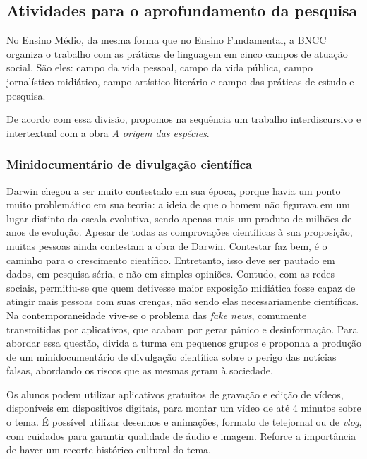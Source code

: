 \documentclass[11pt]{extarticle}
\begin{document}
\subsection{Atividades para o aprofundamento da pesquisa}

No Ensino Médio, da mesma forma que no Ensino Fundamental, a BNCC organiza
o trabalho com as práticas de linguagem em cinco campos de atuação
social. São eles: campo da vida pessoal, campo da vida pública, campo
jornalístico-midiático, campo artístico-literário e campo das práticas de
estudo e pesquisa.

De acordo com essa divisão, propomos na sequência um trabalho interdiscursivo
e intertextual com a obra \emph{A origem das espécies}.
	
\subsubsection{Minidocumentário de
      divulgação científica}

Darwin chegou a ser muito contestado em sua época, porque
      havia um ponto muito problemático em sua teoria: a ideia de que o homem
      não figurava em um lugar distinto da escala evolutiva, sendo apenas mais
      um produto de milhões de anos de evolução. Apesar de todas as
      comprovações científicas à sua proposição, muitas pessoas ainda contestam
      a obra de Darwin. Contestar faz bem, é o caminho para o crescimento
      científico. Entretanto, isso deve ser pautado em dados, em pesquisa
      séria, e não em simples opiniões. Contudo, com as redes sociais,
      permitiu-se que quem detivesse maior exposição midiática fosse capaz de
      atingir mais pessoas com suas crenças, não sendo elas necessariamente
      científicas. Na contemporaneidade vive-se o problema das \emph{fake
      news}, comumente transmitidas por aplicativos, que acabam por gerar
      pânico e desinformação. Para abordar essa questão, divida a turma em
      pequenos grupos e proponha a produção de um minidocumentário de
      divulgação científica sobre o perigo das notícias falsas, abordando os
      riscos que as mesmas geram à sociedade. 

Os alunos podem utilizar aplicativos gratuitos de gravação
  e edição de vídeos, disponíveis em dispositivos digitais, para montar um
  vídeo de até 4 minutos sobre o tema. É possível utilizar desenhos
  e animações, formato de telejornal ou de \emph{vlog}, com cuidados para
  garantir qualidade de áudio e imagem. Reforce a importância de haver um
recorte histórico-cultural do tema.
\end{document}
